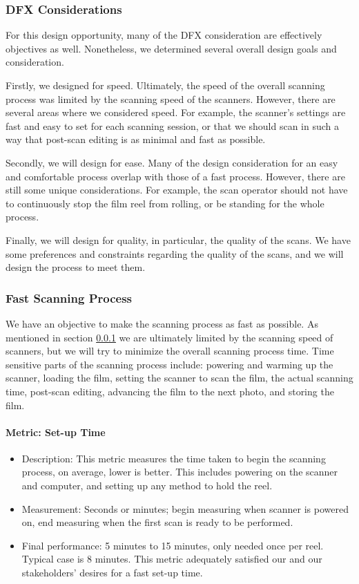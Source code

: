 \documentclass[12pt]{article} %
\begin{document}
\subsubsection{DFX Considerations}\label{dfx}
For this design opportunity, many of the DFX consideration are effectively objectives as well. Nonetheless, we determined several overall design goals and consideration.

Firstly, we designed for speed. Ultimately, the speed of the overall scanning process was limited by the scanning speed of the scanners. However, there are several areas where we considered speed. For example, the scanner's settings are fast and easy to set for each scanning session, or that we should scan in such a way that post-scan editing is as minimal and fast as possible.

Secondly, we will design for ease. Many of the design consideration for an easy and comfortable process overlap with those of a fast process. However, there are still some unique considerations. For example, the scan operator should not have to continuously stop the film reel from rolling, or be standing for the whole process.

Finally, we will design for quality, in particular, the quality of the scans. We have some preferences and constraints regarding the quality of the scans, and we will design the process to meet them.

\subsubsection{Fast Scanning Process} \label{subsubsection: objective fastscanningprocess}
We have an objective to make the scanning process as fast as possible. As mentioned in section \ref{dfx} we are ultimately limited by the scanning speed of scanners, but we will try to minimize the overall scanning process time. Time sensitive parts of the scanning process include: powering and warming up the scanner, loading the film, setting the scanner to scan the film, the actual scanning time, post-scan editing, advancing the film to the next photo, and storing the film.

\paragraph{Metric: Set-up Time}
\begin{itemize}
    \item Description: This metric measures the time taken to begin the scanning process, on average, lower is better. This includes powering on the scanner and computer, and setting up any method to hold the reel.
    \item Measurement: Seconds or minutes; begin measuring when scanner is powered on, end measuring when the first scan is ready to be performed.
    \item Final performance: 5 minutes to 15 minutes, only needed once per reel. Typical case is 8 minutes. This metric adequately satisfied our and our stakeholders' desires for a fast set-up time.
\end{itemize}
\end{document}
